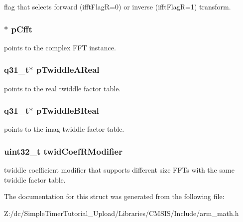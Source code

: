 flag that selects forward (ifft\-Flag\-R=0) or inverse (ifft\-Flag\-R=1) transform. \hypertarget{structarm__rfft__instance__q31_a0b1f4a05c1824bab3b9bd837a260232a}{
\subsubsection[{p\-Cfft}]{$\ast$ p\-Cfft}}\label{structarm__rfft__instance__q31_a0b1f4a05c1824bab3b9bd837a260232a}
points to the complex F\-F\-T instance. \hypertarget{structarm__rfft__instance__q31_a059faa282f9186687d843ead4a7a0d7e}{
\subsubsection[{p\-Twiddle\-A\-Real}]{\setlength{\rightskip}{0pt plus 5cm}q31\-\_\-t$\ast$ p\-Twiddle\-A\-Real}}\label{structarm__rfft__instance__q31_a059faa282f9186687d843ead4a7a0d7e}
points to the real twiddle factor table. \hypertarget{structarm__rfft__instance__q31_a611c385424ce77519f599980f96d5846}{
\subsubsection[{p\-Twiddle\-B\-Real}]{\setlength{\rightskip}{0pt plus 5cm}q31\-\_\-t$\ast$ p\-Twiddle\-B\-Real}}\label{structarm__rfft__instance__q31_a611c385424ce77519f599980f96d5846}
points to the imag twiddle factor table. \hypertarget{structarm__rfft__instance__q31_a5b06f7f76c018db993fe6acc5708c589}{
\subsubsection[{twid\-Coef\-R\-Modifier}]{\setlength{\rightskip}{0pt plus 5cm}uint32\-\_\-t twid\-Coef\-R\-Modifier}}\label{structarm__rfft__instance__q31_a5b06f7f76c018db993fe6acc5708c589}
twiddle coefficient modifier that supports different size F\-F\-Ts with the same twiddle factor table. 

The documentation for this struct was generated from the following file\-:\begin{DoxyCompactItemize}
\item 
Z\-:/dc/\-Simple\-Timer\-Tutorial\-\_\-\-Upload/\-Libraries/\-C\-M\-S\-I\-S/\-Include/arm\-\_\-math.\-h\end{DoxyCompactItemize}
